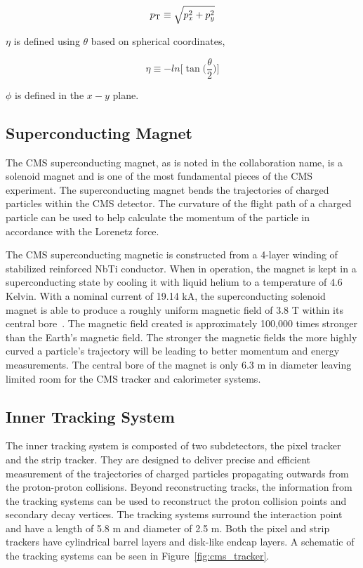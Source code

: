 \begin{equation}
p_\mathrm{T} \equiv \sqrt{p^{2}_{x} + p^{2}_{y}}
\end{equation}

$\eta$ is defined using $\theta$ based on spherical coordinates,

\begin{equation}
\eta \equiv -ln\bigg[\tan\bigg(\frac{\theta}{2}\bigg)\bigg]
\end{equation}

$\phi$ is defined in the $x-y$ plane.



\subsection{Superconducting Magnet}
The CMS superconducting magnet, as is noted in the collaboration name, is 
a solenoid magnet and is one of the most fundamental
pieces of the CMS experiment. The superconducting magnet bends the trajectories of charged particles
within the CMS detector. The curvature of the flight path of a charged particle can be used to help
calculate the momentum of the particle in accordance with the Lorenetz force.

The CMS superconducting magnetic is constructed from a 4-layer winding of stabilized
reinforced NbTi conductor. When in operation, the magnet is kept in a superconducting state
by cooling it with liquid helium to a temperature of 4.6 Kelvin. With a nominal current
of 19.14 kA, the superconducting solenoid magnet is able to produce a roughly uniform
magnetic field of 3.8 T within its central bore~\cite{Chatrchyan:2008zzk}. The magnetic field created is approximately
100,000 times stronger than the Earth's magnetic field. The stronger the magnetic fields the
more highly curved a particle's trajectory will be leading to better momentum and energy measurements.
The central bore of the magnet is only 6.3 m in diameter
leaving limited room for the CMS tracker and calorimeter systems.



\subsection{Inner Tracking System}
The inner tracking system is composted of two subdetectors, the pixel tracker and the
strip tracker. They are designed to deliver precise and efficient measurement of
the trajectories of charged particles propagating outwards from the 
proton-proton collisions. Beyond reconstructing tracks, the information from the
tracking systems can be used to reconstruct the 
proton collision points and secondary decay vertices. The
tracking systems surround the interaction point and have a length of 5.8 m and 
diameter of 2.5 m. Both the pixel and strip trackers have cylindrical barrel
layers and disk-like endcap layers. A schematic of the tracking systems
can be seen in Figure~\ref{fig:cms_tracker}.

